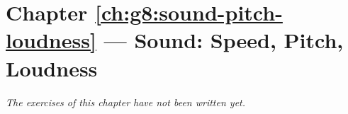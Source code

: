 \section*{Chapter \ref{ch:g8:sound-pitch-loudness} --- Sound: Speed, Pitch, Loudness}


\emph{The exercises of this chapter have not been written yet.}

